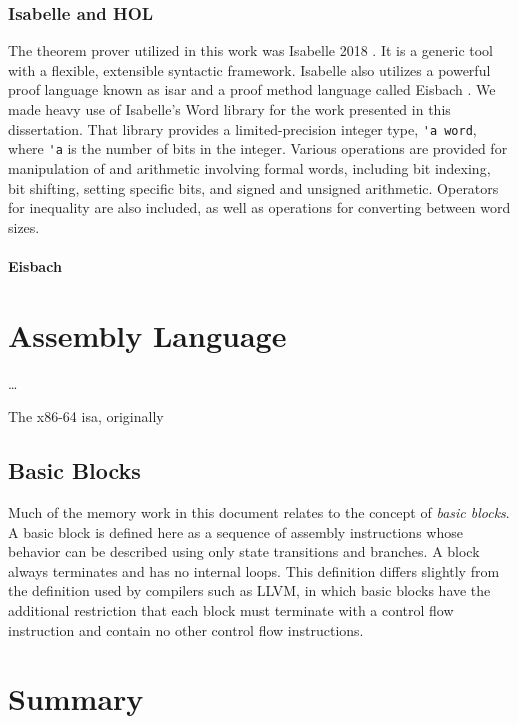 \subsubsection{Isabelle and HOL}
The theorem prover utilized in this work
was Isabelle 2018 \autocite{nipkow2002isabelle}.%
It is a generic tool with a flexible, extensible syntactic framework.
Isabelle also utilizes a powerful proof language
known as \ac{isar} \cite{wenzel2007isabelle}
and a proof method language called Eisbach \autocite{matichuk2016eisbach}.
We made heavy use of Isabelle's Word library \cite{isabelle-word-session}
for the work presented in this dissertation.
That library provides a limited-precision integer type, \lstinline|'a word|,
where \lstinline|'a| is the number of bits in the integer.
Various operations are provided for manipulation of and arithmetic involving formal words,
including bit indexing, bit shifting, setting specific bits,
and signed and unsigned arithmetic.
Operators for inequality are also included,
as well as operations for converting between word sizes.

\paragraph{Eisbach}


%
%

\section{Assembly Language}
\todo\dots

The x86-64
\ac{isa}, originally

\subsection{Basic Blocks}
Much of the memory work in this document relates to the concept of \emph{basic blocks}.%
A basic block is defined here as a sequence of assembly instructions
whose behavior can be described using only state transitions and branches.
A block always terminates and has no internal loops.
This definition differs slightly from the definition used by compilers such as LLVM,
in which basic blocks have the additional restriction that
each block must terminate with a control flow instruction and contain no other
control flow instructions.

\section{Summary}
